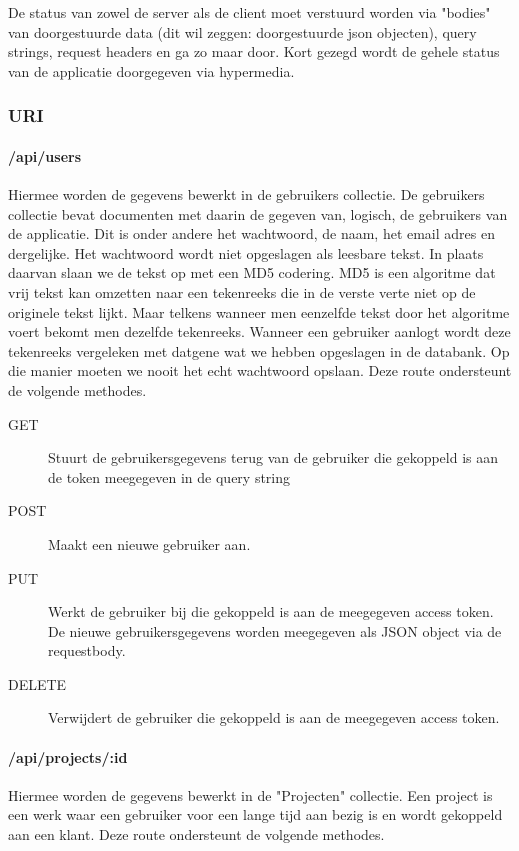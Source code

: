 \documentclass[a4paper,11pt]{article}
\begin{document}
De status van zowel de server als de client moet verstuurd worden via "bodies" van doorgestuurde data (dit wil zeggen: doorgestuurde json objecten), query strings, request headers en ga zo maar door. Kort gezegd wordt de gehele status van de applicatie doorgegeven via hypermedia.

\subsubsection{URI}
\paragraph{/api/users}
Hiermee worden de gegevens bewerkt in de gebruikers collectie. De gebruikers collectie bevat documenten met daarin de gegeven van, logisch, de gebruikers van de applicatie. Dit is onder andere het wachtwoord, de naam, het email adres en dergelijke. Het wachtwoord wordt niet opgeslagen als leesbare tekst. In plaats daarvan slaan we de tekst op met een MD5 codering. MD5 is een algoritme dat vrij tekst kan omzetten naar een tekenreeks die in de verste verte niet op de originele tekst lijkt. Maar telkens wanneer men eenzelfde tekst door het algoritme voert bekomt men dezelfde tekenreeks. Wanneer een gebruiker aanlogt wordt deze tekenreeks vergeleken met datgene wat we hebben opgeslagen in de databank. Op die manier moeten we nooit het echt wachtwoord opslaan. Deze route ondersteunt de volgende methodes.

\begin{description}
\item[GET] Stuurt de gebruikersgegevens terug van de gebruiker die gekoppeld is aan de token meegegeven in de query string
\item[POST] Maakt een nieuwe gebruiker aan.
\item[PUT] Werkt de gebruiker bij die gekoppeld is aan de meegegeven access token. De nieuwe gebruikersgegevens worden meegegeven als JSON object via de requestbody.
\item[DELETE] Verwijdert de gebruiker die gekoppeld is aan de meegegeven access token.
\end{description}

\paragraph{/api/projects/:id}
Hiermee worden de gegevens bewerkt in de "Projecten" collectie. Een project is een werk waar een gebruiker voor een lange tijd aan bezig is en wordt gekoppeld aan een klant. Deze route ondersteunt de volgende methodes.
\end{document}
